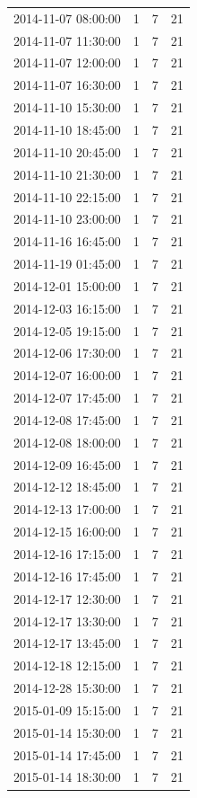 \begin{tabular}{lrrr}
2014-11-07 08:00:00 & 1 & 7 & 21 \\
2014-11-07 11:30:00 & 1 & 7 & 21 \\
2014-11-07 12:00:00 & 1 & 7 & 21 \\
2014-11-07 16:30:00 & 1 & 7 & 21 \\
2014-11-10 15:30:00 & 1 & 7 & 21 \\
2014-11-10 18:45:00 & 1 & 7 & 21 \\
2014-11-10 20:45:00 & 1 & 7 & 21 \\
2014-11-10 21:30:00 & 1 & 7 & 21 \\
2014-11-10 22:15:00 & 1 & 7 & 21 \\
2014-11-10 23:00:00 & 1 & 7 & 21 \\
2014-11-16 16:45:00 & 1 & 7 & 21 \\
2014-11-19 01:45:00 & 1 & 7 & 21 \\
2014-12-01 15:00:00 & 1 & 7 & 21 \\
2014-12-03 16:15:00 & 1 & 7 & 21 \\
2014-12-05 19:15:00 & 1 & 7 & 21 \\
2014-12-06 17:30:00 & 1 & 7 & 21 \\
2014-12-07 16:00:00 & 1 & 7 & 21 \\
2014-12-07 17:45:00 & 1 & 7 & 21 \\
2014-12-08 17:45:00 & 1 & 7 & 21 \\
2014-12-08 18:00:00 & 1 & 7 & 21 \\
2014-12-09 16:45:00 & 1 & 7 & 21 \\
2014-12-12 18:45:00 & 1 & 7 & 21 \\
2014-12-13 17:00:00 & 1 & 7 & 21 \\
2014-12-15 16:00:00 & 1 & 7 & 21 \\
2014-12-16 17:15:00 & 1 & 7 & 21 \\
2014-12-16 17:45:00 & 1 & 7 & 21 \\
2014-12-17 12:30:00 & 1 & 7 & 21 \\
2014-12-17 13:30:00 & 1 & 7 & 21 \\
2014-12-17 13:45:00 & 1 & 7 & 21 \\
2014-12-18 12:15:00 & 1 & 7 & 21 \\
2014-12-28 15:30:00 & 1 & 7 & 21 \\
2015-01-09 15:15:00 & 1 & 7 & 21 \\
2015-01-14 15:30:00 & 1 & 7 & 21 \\
2015-01-14 17:45:00 & 1 & 7 & 21 \\
2015-01-14 18:30:00 & 1 & 7 & 21 \\

\end{tabular}
